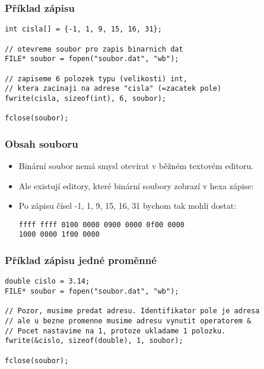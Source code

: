 \documentclass{beamer}
\newenvironment{itemizex}%
  {\large \begin{itemize}%
    \setlength{\itemsep}{8pt}%
    \setlength{\parskip}{8pt}}%
  {\end{itemize}}
\begin{document}
\begin{frame}[t,fragile]\frametitle{Příklad zápisu} 
\begin{verbatim} 
int cisla[] = {-1, 1, 9, 15, 16, 31};

// otevreme soubor pro zapis binarnich dat
FILE* soubor = fopen("soubor.dat", "wb");

// zapiseme 6 polozek typu (velikosti) int,
// ktera zacinaji na adrese "cisla" (=zacatek pole)
fwrite(cisla, sizeof(int), 6, soubor);

fclose(soubor);
\end{verbatim}
\end{frame}


\begin{frame}[t,fragile]\frametitle{Obsah souboru} 
    \begin{itemizex}
        \item Binární soubor nemá smysl otevírat v běžném textovém editoru.
        \item Ale existují editory, které binární soubory zobrazí v hexa zápise:
        \item Po zápisu čísel -1, 1, 9, 15, 16, 31 bychom tak mohli dostat:
\begin{verbatim} 
ffff ffff 0100 0000 0900 0000 0f00 0000
1000 0000 1f00 0000 
\end{verbatim}
    \end{itemizex}
\end{frame}


\begin{frame}[t,fragile]\frametitle{Příklad zápisu jedné proměnné} 
\begin{verbatim} 
double cislo = 3.14;
FILE* soubor = fopen("soubor.dat", "wb");

// Pozor, musime predat adresu. Identifikator pole je adresa
// ale u bezne promenne musime adresu vynutit operatorem &
// Pocet nastavime na 1, protoze ukladame 1 polozku.
fwrite(&cislo, sizeof(double), 1, soubor);

fclose(soubor);
\end{verbatim}
\end{frame}
\end{document}
